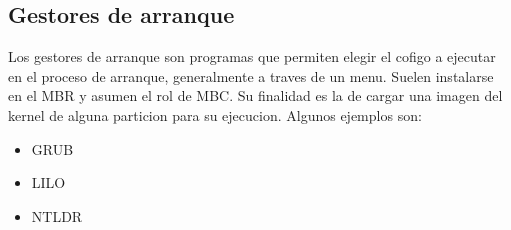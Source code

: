 \documentclass[11pt]{article}
\begin{document}
\subsection{Gestores de arranque}
Los gestores de arranque son programas que permiten elegir el cofigo a ejecutar en el proceso de arranque, generalmente a traves de un menu. Suelen instalarse en el MBR y asumen el rol de MBC. Su finalidad es la de cargar una imagen del kernel de alguna particion para su ejecucion. Algunos ejemplos son:
\begin{itemize}
    \item GRUB
    \item LILO
    \item NTLDR
\end{itemize}

\subsection{}
\end{document}
